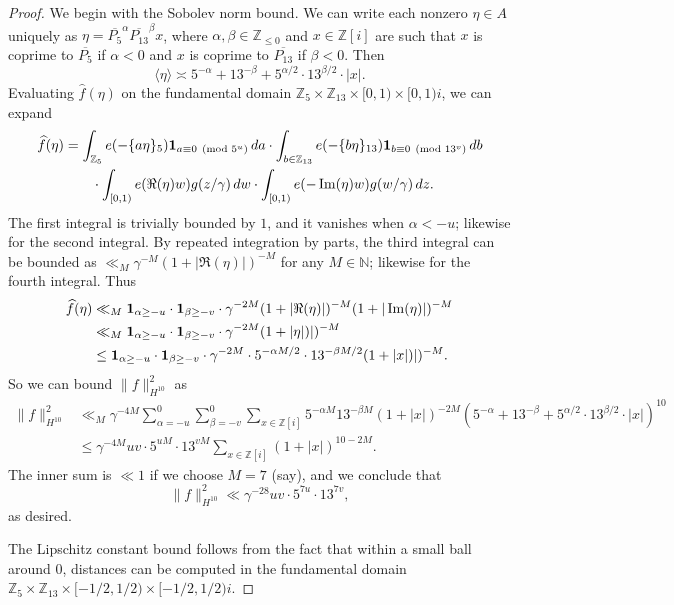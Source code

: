 \documentclass[11pt]{amsart}
\theoremstyle{definition}
\DeclareMathOperator{\Imag}{Im}
\renewcommand{\Im}{\Imag}
\begin{document}
\begin{proof}
We begin with the Sobolev norm bound.  We can write each nonzero $\eta \in A$ uniquely as $\eta=\overline{P_5}^\alpha \overline{P_{13}}^\beta x$, where $\alpha,\beta \in \mathbb{Z}_{\leq 0}$ and $x \in \mathbb{Z}[i]$ are such that $x$ is coprime to $\overline{P_5}$ if $\alpha<0$ and $x$ is coprime to $\overline{P_{13}}$ if $\beta<0$.
Then $$\langle \eta \rangle\asymp 5^{-\alpha}+13^{-\beta}+5^{\alpha/2} \cdot 13^{\beta/2} \cdot |x|.$$
Evaluating $\widehat{f}(\eta)$ on the fundamental domain $\mathbb{Z}_5 \times \mathbb{Z}_{13} \times [0,1) \times [0,1)i$, we can expand
\begin{align*}
\widehat{f}(\eta) &=\int_{\mathbb{Z}_5} e(-\{a\eta\}_5) {\bf 1}_{a \equiv 0 \pmod{5^u}} \,da  \cdot \int_{b \in \mathbb{Z}_{13}} e(-\{b\eta\}_{13}){\bf 1}_{b \equiv 0 \pmod{13^v}} \,db\\
 & \qquad \cdot \int_{[0,1)} e(\Re(\eta )w)g(z/\gamma) \,dw \cdot \int_{[0,1)} e(-\Im(\eta)w)g(w/\gamma) \,dz.
\end{align*}
The first integral is trivially bounded by $1$, and it vanishes when $\alpha<-u$; likewise for the second integral.  By repeated integration by parts, the third integral can be bounded as $\ll_M \gamma^{-M}(1+|\Re(\eta)|)^{-M}$ for any $M \in \mathbb{N}$; likewise for the fourth integral.  Thus
\begin{align*}
\widehat{f}(\eta) &\ll_M {\bf 1}_{\alpha \geq -u} \cdot {\bf 1}_{\beta \geq -v} \cdot \gamma^{-2M} (1+|\Re(\eta)|)^{-M}(1+|\Im(\eta)|)^{-M}\\
 &\ll_M {\bf 1}_{\alpha \geq -u} \cdot {\bf 1}_{\beta \geq -v} \cdot \gamma^{-2M} (1+|\eta|)|)^{-M}\\
 &\leq {\bf 1}_{\alpha \geq -u} \cdot {\bf 1}_{\beta \geq -v} \cdot \gamma^{-2M} \cdot 5^{-\alpha M/2} \cdot 13^{-\beta M/2} (1+|x|)|)^{-M}.
\end{align*}
So we can bound $\|f\|_{H^{10}}^2$ as
\begin{align*}
\|f\|_{H^{10}}^2 &\ll_M \gamma^{-4M} \sum_{\alpha=-u}^0 \sum_{\beta=-v}^0 \sum_{x \in \mathbb{Z}[i]} 5^{-\alpha M}13^{-\beta M} (1+|x|)^{-2M} (5^{-\alpha}+13^{-\beta}+5^{\alpha/2} \cdot 13^{\beta/2} \cdot |x|)^{10}\\
 &\leq \gamma^{-4M} uv \cdot 5^{uM} \cdot 13^{vM} \sum_{x \in \mathbb{Z}[i]} (1+|x|)^{10-2M}.
\end{align*}
The inner sum is $\ll 1$ if we choose $M=7$ (say), and we conclude that
$$\|f\|_{H^{10}}^2 \ll \gamma^{-28}uv \cdot 5^{7u} \cdot 13^{7v},$$
as desired.

The Lipschitz constant bound follows from the fact that within a small ball around $0$, distances can be computed in the fundamental domain $\mathbb{Z}_5 \times \mathbb{Z}_{13} \times [-1/2,1/2) \times [-1/2,1/2)i$.
\end{proof}
\end{document}
